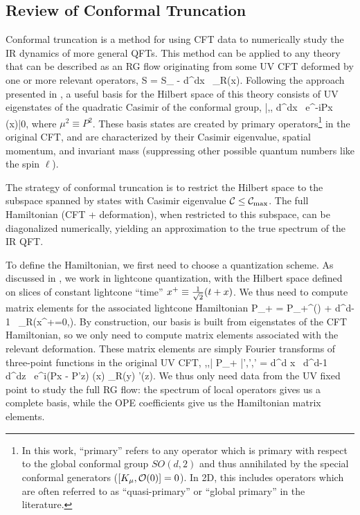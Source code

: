 

\subsection{Review of Conformal Truncation}

Conformal truncation is a method for using CFT data to numerically study the IR 
dynamics of more general QFTs. This method can be applied to any theory that can 
be described as an RG flow originating from some UV CFT deformed by one or more 
relevant operators,
\be
S = S_{\CFT} - \lambda \int d^dx \, \Ocal_R(x).
\ee
Following the approach presented in \cite{ref:matt3d}, a useful basis for the 
Hilbert space of this theory consists of UV eigenstates of the quadratic Casimir 
of the conformal group,
\be
|\Ccal,,\mu\> \equiv \int d^dx \, e^{-iP\cdot x} \Ocal(x)|0\>,
\label{eq:basis}
\ee
where $\mu^2 \equiv P^2$. These basis states are created by primary 
operators\footnote{In this work, ``primary'' refers to any operator which is 
primary with respect to the global conformal group $SO(d,2)$ and thus 
annihilated by the special conformal generators ($[K_\mu,{\cal O}(0)] = 0$). 
In 2D, this includes operators which are often referred to as ``quasi-primary'' 
or ``global primary'' in the literature.} in the original CFT, and are 
characterized by their Casimir eigenvalue, spatial momentum, and invariant mass 
(suppressing other possible quantum numbers like the spin $\ell$). 

The strategy of conformal truncation is to restrict the Hilbert space to the 
subspace spanned by states with Casimir eigenvalue ${\cal C} \leq {\cal C}_{\max}$. The full 
Hamiltonian (CFT + deformation), when restricted to this subspace, can be 
diagonalized numerically, yielding an approximation to the true spectrum of the 
IR QFT.

To define the Hamiltonian, we first need to choose a quantization scheme. As 
discussed in \cite{ref:matt3d}, we work in lightcone quantization, with the 
Hilbert space defined on slices of constant lightcone ``time'' 
$x^+ \equiv \frac{1}{\sqrt{2}}(t+x)$. We thus need to compute matrix elements for 
the associated lightcone Hamiltonian
\be
P_+ = P_+^{(\CFT)} + \lambda \int d^{d-1} \, \Ocal_R(x^+=0,).
\ee
By construction, our basis is built from eigenstates of the CFT Hamiltonian, so 
we only need to compute matrix elements associated with the relevant 
deformation. These matrix elements are simply Fourier transforms of three-point 
functions in the original UV CFT,
\be
\<\Ccal,,\mu| \de P_+ |\Ccal',',\mu'\> = \lambda \int d^d x \, d^{d-1} \, d^dz \, e^{i(P\cdot x - P'\cdot z)} \<\Ocal(x) \Ocal_R(y) \Ocal'(z)\>.
\label{eq:MatrixDef}
\ee
We thus only need data from the UV fixed point to study the full RG flow: the 
spectrum of local operators gives us a complete basis, while the OPE 
coefficients give us the Hamiltonian matrix elements.



